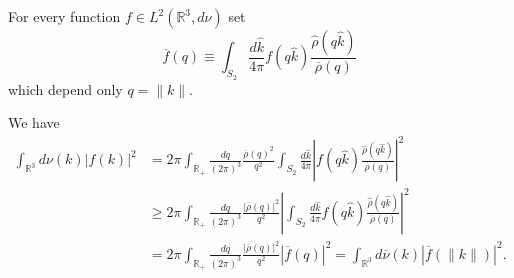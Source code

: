 For every function $f \in L^2(\mathbb{R}^3,d\nu)$ set 
$$
\overline{f}(q) \equiv 
\int_{S_2} \frac{d\hat{k}}{4 \pi} f(q\hat{k})
  \frac{\hat{\rho}(q\hat{k})}{\overline{\rho}(q)}   
$$ 
which depend only $q = \|k\|$. 

We have
\begin{equation*}
\begin{split}
\int_{\mathbb{R}^3} d\nu(k) |f(k)|^2 & = 2 \pi \int_{\mathbb{R}_+}
\frac{dq}{(2\pi)^3}
\frac{\overline{\rho}(q)^2}{q^2} \int_{S_2} \frac{d\hat{k}}{4 \pi}
\left| f(q\hat{k}) \frac{\hat{\rho}(q\hat{k})}{\overline{\rho}(q)}\right|^2
\\ & \ge 2 \pi \int_{\mathbb{R}_+} \frac{dq}{(2\pi)^3}
\frac{|\overline{\rho}(q)|^2}{q^2} 
\left|\int_{S_2} \frac{d\hat{k}}{4 \pi} f(q\hat{k})
  \frac{\hat{\rho}(q\hat{k})}{\overline{\rho}(q)} \right|^2   
\\ & =  2 \pi \int_{\mathbb{R}_+} \frac{dq}{(2\pi)^3}
\frac{|\overline{\rho}(q)|^2}{q^2} 
|\overline{f}(q)| ^2  
= \int_{\mathbb{R}^3} d\overline{\nu}(k) |\overline{f}(\|k\|)|^2.
\end{split}
\end{equation*}


